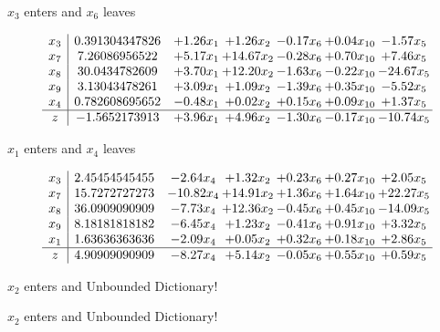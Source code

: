 \documentclass[9pt]{article}
\begin{document}
 $ x_{3} $ enters and $ x_{6} $ leaves 

 \[\begin{array}{c| c c@{\hskip 2pt} c@{\hskip 2pt} c@{\hskip 2pt} c@{\hskip 2pt} c@{\hskip 2pt} }
 x_{3}   &  0.391304347826 & +  1.26 x_{1} & +  1.26 x_{2} & -0.17 x_{6} & +  0.04 x_{10} & -1.57 x_{5}\\
 x_{7}   &  7.26086956522 & +  5.17 x_{1} & + 14.67 x_{2} & -0.28 x_{6} & +  0.70 x_{10} & +  7.46 x_{5}\\
 x_{8}   &  30.0434782609 & +  3.70 x_{1} & + 12.20 x_{2} & -1.63 x_{6} & -0.22 x_{10} & -24.67 x_{5}\\
 x_{9}   &  3.13043478261 & +  3.09 x_{1} & +  1.09 x_{2} & -1.39 x_{6} & +  0.35 x_{10} & -5.52 x_{5}\\
 x_{4}   &  0.782608695652 & -0.48 x_{1} & +  0.02 x_{2} & +  0.15 x_{6} & +  0.09 x_{10} & +  1.37 x_{5}\\
\hline
z    &  -1.5652173913 & +  3.96 x_{1} & +  4.96 x_{2} & -1.30 x_{6} & -0.17 x_{10} & -10.74 x_{5}\\
\end{array}\]


 $ x_{1} $ enters and $ x_{4} $ leaves 

 \[\begin{array}{c| c c@{\hskip 2pt} c@{\hskip 2pt} c@{\hskip 2pt} c@{\hskip 2pt} c@{\hskip 2pt} }
 x_{3}   &  2.45454545455 & -2.64 x_{4} & +  1.32 x_{2} & +  0.23 x_{6} & +  0.27 x_{10} & +  2.05 x_{5}\\
 x_{7}   &  15.7272727273 & -10.82 x_{4} & + 14.91 x_{2} & +  1.36 x_{6} & +  1.64 x_{10} & + 22.27 x_{5}\\
 x_{8}   &  36.0909090909 & -7.73 x_{4} & + 12.36 x_{2} & -0.45 x_{6} & +  0.45 x_{10} & -14.09 x_{5}\\
 x_{9}   &  8.18181818182 & -6.45 x_{4} & +  1.23 x_{2} & -0.41 x_{6} & +  0.91 x_{10} & +  3.32 x_{5}\\
 x_{1}   &  1.63636363636 & -2.09 x_{4} & +  0.05 x_{2} & +  0.32 x_{6} & +  0.18 x_{10} & +  2.86 x_{5}\\
\hline
z    &  4.90909090909 & -8.27 x_{4} & +  5.14 x_{2} & -0.05 x_{6} & +  0.55 x_{10} & +  0.59 x_{5}\\
\end{array}\]


 $ x_{2} $ enters and Unbounded Dictionary!


 $ x_{2} $ enters and Unbounded Dictionary!
\end{document}
